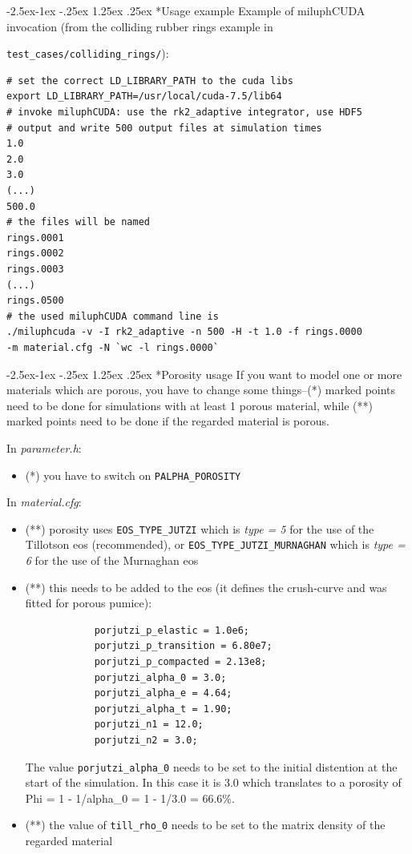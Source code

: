 \documentclass[10pt,fleqn,twoside]{article}
\makeatletter
\renewcommand\paragraph{\@startsection{paragraph}{4}{\z@}%
            {-2.5ex\@plus -1ex \@minus -.25ex}%
            {1.25ex \@plus .25ex}%
            {\normalfont\normalsize\bfseries}}
\makeatother
\begin{document}
\paragraph*{Usage example}
Example of miluphCUDA invocation (from the colliding rubber rings example in

\verb|test_cases/colliding_rings/|):

\begin{verbatim}
# set the correct LD_LIBRARY_PATH to the cuda libs
export LD_LIBRARY_PATH=/usr/local/cuda-7.5/lib64
# invoke miluphCUDA: use the rk2_adaptive integrator, use HDF5
# output and write 500 output files at simulation times
1.0
2.0
3.0
(...)
500.0
# the files will be named
rings.0001
rings.0002
rings.0003
(...)
rings.0500
# the used miluphCUDA command line is
./miluphcuda -v -I rk2_adaptive -n 500 -H -t 1.0 -f rings.0000
-m material.cfg -N `wc -l rings.0000`
\end{verbatim}



\paragraph*{Porosity usage}
If you want to model one or more materials which are porous, you have to change some things--(*) marked points need to be done for simulations with at least 1 porous material, while (**) marked points need to be done if the regarded material is porous.

In \emph{parameter.h}:
\begin{itemize}
\item (*) you have to switch on \verb|PALPHA_POROSITY|
\end{itemize}

In \emph{material.cfg}:
\begin{itemize}
\item (**) porosity uses \verb|EOS_TYPE_JUTZI| which is \emph{type = 5} for the use of the Tillotson eos (recommended), or \verb|EOS_TYPE_JUTZI_MURNAGHAN| which is \emph{type = 6} for the use of the Murnaghan eos
\item (**) this needs to be added to the eos (it defines the crush-curve and was fitted for porous pumice):
\begin{verbatim}
            porjutzi_p_elastic = 1.0e6;
            porjutzi_p_transition = 6.80e7;
            porjutzi_p_compacted = 2.13e8;
            porjutzi_alpha_0 = 3.0;
            porjutzi_alpha_e = 4.64;
            porjutzi_alpha_t = 1.90;
            porjutzi_n1 = 12.0;
            porjutzi_n2 = 3.0;
\end{verbatim}
The value \verb|porjutzi_alpha_0| needs to be set to the initial distention at the start of the simulation. In this case it is 3.0 which translates to a porosity of Phi = 1 - 1/alpha\_0 = 1 - 1/3.0 = 66.6\%.
\item (**) the value of \verb|till_rho_0| needs to be set to the matrix density of the regarded material
\end{itemize}
\end{document}
